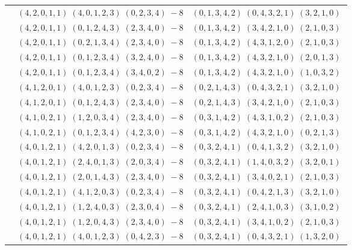 \documentclass[11pt]{article}
\begin{document}
\begin{longtable}[l]{|c|c|c|}
 \cline{2-3} 
 & $(4 ,2 ,0 ,1 ,1) \;(4 ,0 ,1 ,2 ,3) \;(0 ,2 ,3 ,4) \;-8$ & $(0 ,1 ,3 ,4 ,2) \;(0 ,4 ,3 ,2 ,1) \;(3 ,2 ,1 ,0) \;$\\ 
 \cline{2-3} 
 & $(4 ,2 ,0 ,1 ,1) \;(0 ,1 ,2 ,4 ,3) \;(2 ,3 ,4 ,0) \;-8$ & $(0 ,1 ,3 ,4 ,2) \;(3 ,4 ,2 ,1 ,0) \;(2 ,1 ,0 ,3) \;$\\ 
 \cline{2-3} 
 & $(4 ,2 ,0 ,1 ,1) \;(0 ,2 ,1 ,3 ,4) \;(2 ,3 ,4 ,0) \;-8$ & $(0 ,1 ,3 ,4 ,2) \;(4 ,3 ,1 ,2 ,0) \;(2 ,1 ,0 ,3) \;$\\ 
 \cline{2-3} 
 & $(4 ,2 ,0 ,1 ,1) \;(0 ,1 ,2 ,3 ,4) \;(3 ,2 ,4 ,0) \;-8$ & $(0 ,1 ,3 ,4 ,2) \;(4 ,3 ,2 ,1 ,0) \;(2 ,0 ,1 ,3) \;$\\ 
 \cline{2-3} 
 & $(4 ,2 ,0 ,1 ,1) \;(0 ,1 ,2 ,3 ,4) \;(3 ,4 ,0 ,2) \;-8$ & $(0 ,1 ,3 ,4 ,2) \;(4 ,3 ,2 ,1 ,0) \;(1 ,0 ,3 ,2) \;$\\ 
 \cline{2-3} 
 & $(4 ,1 ,2 ,0 ,1) \;(4 ,0 ,1 ,2 ,3) \;(0 ,2 ,3 ,4) \;-8$ & $(0 ,2 ,1 ,4 ,3) \;(0 ,4 ,3 ,2 ,1) \;(3 ,2 ,1 ,0) \;$\\ 
 \cline{2-3} 
 & $(4 ,1 ,2 ,0 ,1) \;(0 ,1 ,2 ,4 ,3) \;(2 ,3 ,4 ,0) \;-8$ & $(0 ,2 ,1 ,4 ,3) \;(3 ,4 ,2 ,1 ,0) \;(2 ,1 ,0 ,3) \;$\\ 
 \cline{2-3} 
 & $(4 ,1 ,0 ,2 ,1) \;(1 ,2 ,0 ,3 ,4) \;(2 ,3 ,4 ,0) \;-8$ & $(0 ,3 ,1 ,4 ,2) \;(4 ,3 ,1 ,0 ,2) \;(2 ,1 ,0 ,3) \;$\\ 
 \cline{2-3} 
 & $(4 ,1 ,0 ,2 ,1) \;(0 ,1 ,2 ,3 ,4) \;(4 ,2 ,3 ,0) \;-8$ & $(0 ,3 ,1 ,4 ,2) \;(4 ,3 ,2 ,1 ,0) \;(0 ,2 ,1 ,3) \;$\\ 
 \cline{2-3} 
 & $(4 ,0 ,1 ,2 ,1) \;(4 ,2 ,0 ,1 ,3) \;(0 ,2 ,3 ,4) \;-8$ & $(0 ,3 ,2 ,4 ,1) \;(0 ,4 ,1 ,3 ,2) \;(3 ,2 ,1 ,0) \;$\\ 
 \cline{2-3} 
 & $(4 ,0 ,1 ,2 ,1) \;(2 ,4 ,0 ,1 ,3) \;(2 ,0 ,3 ,4) \;-8$ & $(0 ,3 ,2 ,4 ,1) \;(1 ,4 ,0 ,3 ,2) \;(3 ,2 ,0 ,1) \;$\\ 
 \cline{2-3} 
 & $(4 ,0 ,1 ,2 ,1) \;(2 ,0 ,1 ,4 ,3) \;(2 ,3 ,4 ,0) \;-8$ & $(0 ,3 ,2 ,4 ,1) \;(3 ,4 ,0 ,2 ,1) \;(2 ,1 ,0 ,3) \;$\\ 
 \cline{2-3} 
 & $(4 ,0 ,1 ,2 ,1) \;(4 ,1 ,2 ,0 ,3) \;(0 ,2 ,3 ,4) \;-8$ & $(0 ,3 ,2 ,4 ,1) \;(0 ,4 ,2 ,1 ,3) \;(3 ,2 ,1 ,0) \;$\\ 
 \cline{2-3} 
 & $(4 ,0 ,1 ,2 ,1) \;(1 ,2 ,4 ,0 ,3) \;(2 ,3 ,0 ,4) \;-8$ & $(0 ,3 ,2 ,4 ,1) \;(2 ,4 ,1 ,0 ,3) \;(3 ,1 ,0 ,2) \;$\\ 
 \cline{2-3} 
 & $(4 ,0 ,1 ,2 ,1) \;(1 ,2 ,0 ,4 ,3) \;(2 ,3 ,4 ,0) \;-8$ & $(0 ,3 ,2 ,4 ,1) \;(3 ,4 ,1 ,0 ,2) \;(2 ,1 ,0 ,3) \;$\\ 
 \cline{2-3} 
 & $(4 ,0 ,1 ,2 ,1) \;(4 ,0 ,1 ,2 ,3) \;(0 ,4 ,2 ,3) \;-8$ & $(0 ,3 ,2 ,4 ,1) \;(0 ,4 ,3 ,2 ,1) \;(1 ,3 ,2 ,0) \;$\\ 

\end{longtable}
\end{document}
